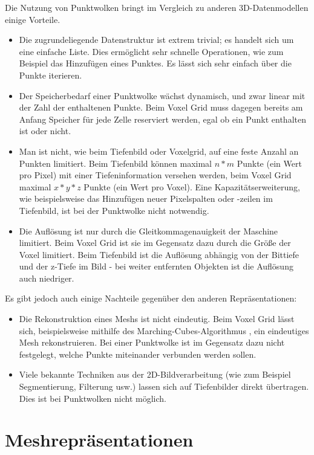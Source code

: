 Die Nutzung von Punktwolken bringt im Vergleich zu anderen 3D-Datenmodellen einige Vorteile.

\begin{itemize}
\item Die zugrundeliegende Datenstruktur ist extrem trivial; es handelt sich um eine einfache Liste.
Dies ermöglicht sehr schnelle Operationen, wie zum Beispiel das Hinzufügen eines Punktes.
Es lässt sich sehr einfach über die Punkte iterieren.
\item Der Speicherbedarf einer Punktwolke wächst dynamisch, und zwar linear mit der Zahl der enthaltenen Punkte.
Beim Voxel Grid muss dagegen bereits am Anfang Speicher für jede Zelle reserviert werden, egal ob ein Punkt enthalten ist oder nicht.
\item Man ist nicht, wie beim Tiefenbild oder Voxelgrid, auf eine feste Anzahl an Punkten limitiert.
Beim Tiefenbild können maximal $n * m$ Punkte (ein Wert pro Pixel) mit einer Tiefeninformation versehen werden, beim Voxel Grid maximal $x * y * z$ Punkte (ein Wert pro Voxel).
Eine Kapazitätserweiterung, wie beispielsweise das Hinzufügen neuer Pixelspalten oder -zeilen im Tiefenbild, ist bei der Punktwolke nicht notwendig.
\item Die Auflösung ist nur durch die Gleitkommagenauigkeit der Maschine limitiert.
Beim Voxel Grid ist sie im Gegensatz dazu durch die Größe der Voxel limitiert.
Beim Tiefenbild ist die Auflösung abhängig von der Bittiefe und der z-Tiefe im Bild - bei weiter entfernten Objekten ist die Auflösung auch niedriger.
\end{itemize}

Es gibt jedoch auch einige Nachteile gegenüber den anderen Repräsentationen:

\begin{itemize}
\item Die Rekonstruktion eines Meshs ist nicht eindeutig.
Beim Voxel Grid lässt sich, beispielsweise mithilfe des Marching-Cubes-Algorithmus \cite{lorensen1987marching}, ein eindeutiges Mesh rekonstruieren.
Bei einer Punktwolke ist im Gegensatz dazu nicht festgelegt, welche Punkte miteinander verbunden werden sollen.
\item Viele bekannte Techniken aus der 2D-Bildverarbeitung (wie zum Beispiel Segmentierung, Filterung usw.) lassen sich auf Tiefenbilder direkt übertragen.
Dies ist bei Punktwolken nicht möglich.
\end{itemize}


\section{Meshrepräsentationen}
\label{sec:meshrepr}

